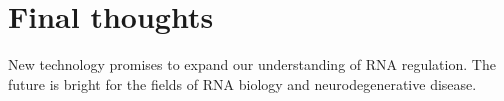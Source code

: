 






\section{Final thoughts}

New technology promises to expand our understanding of RNA regulation.
The future is bright for the fields of RNA biology and neurodegenerative disease. 




